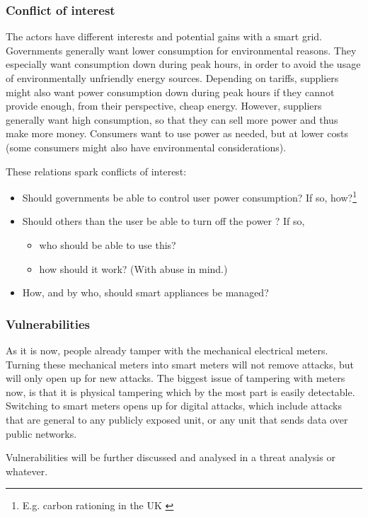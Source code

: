 \subsubsection{Conflict of interest}
The actors have different interests and potential gains with a smart grid.
Governments generally want lower consumption for environmental reasons.
They especially want consumption down during peak hours, in order to avoid the usage of environmentally unfriendly energy sources.
Depending on tariffs, suppliers might also want power consumption down during peak hours if they cannot provide enough, from their perspective, cheap energy.
However, suppliers generally want high consumption, so that they can sell more power and thus make more money.
Consumers want to use power as needed, but at lower costs (some consumers might also have environmental considerations).

These relations spark conflicts of interest:
\begin{itemize}
	\item Should governments be able to control user power consumption? If so, how?\footnote{E.g. carbon rationing in the UK \cite[]{security_economics}}
	\item Should others than the user be able to turn off the power \cite[]{offswitch}? If so,
	\begin{itemize}
		\item who should be able to use this?
		\item how should it work? (With abuse in mind.)
	\end{itemize}
	\item How, and by who, should smart appliances be managed?
\end{itemize}

\subsubsection{Vulnerabilities}
As it is now, people already tamper with the mechanical electrical meters.
Turning these mechanical meters into smart meters will not remove attacks, but will only open up for new attacks.
The biggest issue of tampering with meters now, is that it is physical tampering which by the most part is easily detectable.
Switching to smart meters opens up for digital attacks, which include attacks that are general to any publicly exposed unit, or any unit that sends data over public networks.

Vulnerabilities will be further discussed and analysed in a threat analysis or whatever.